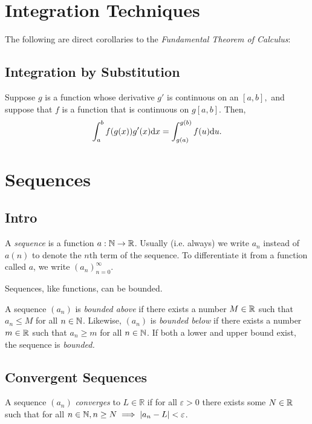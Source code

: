 \documentclass{article}
\begin{document}
  \pagebreak


  \section{Integration Techniques}
  The following are direct corollaries to the \emph{Fundamental Theorem of Calculus}:

  \subsection{Integration by Substitution}
  \begin{thm}[u-substitution]
    Suppose \(g\) is a function whose derivative \(g'\) is continuous on an \([a,b],\) and suppose that \(f\) is a function that is continuous on \(g[a,b].\) Then, \[
      \int_{a}^{b}f(g(x))g'(x) \mathrm{d} x = \int_{g(a)}^{g(b)}f(u) \mathrm{d} u.
    \]
  \end{thm}

  \section{Sequences}
  \subsection{Intro}

  \begin{defi}[Sequence]
    A \emph{sequence} is a function \(a: \mathbb{N} \to \mathbb{R}\). Usually (i.e. always) we write \(a_n\) instead of \(a(n)\) to denote the \(n\)th term of the sequence. To differentiate it from a function called \(a\), we write \((a_n)_{n=0}^{\infty}\). 
    \end{defi}
    Sequences, like functions, can be bounded. 

    \begin{defi}[Boundedness]
      A sequence \((a_n)\) is \emph{bounded above} if there exists a number \(M \in \mathbb{R}\) such that \(a_n \leq M\) for all \(n \in \mathbb{N}\). Likewise, \((a_n)\) is \emph{bounded below} if there exists a number \(m \in \mathbb{R}\) such that \(a_n \geq m\) for all \(n \in \mathbb{N}\). If both a lower and upper bound exist, the sequence is \emph{bounded.}
    \end{defi}

    \subsection{Convergent Sequences}

    \begin{defi}
      A sequence \((a_n)\) \emph{converges} to \(L \in \mathds{R}\) if for all \(\varepsilon > 0\) there exists some \(N \in \mathbb{R}\) such that for all \(n \in \mathbb{N}, n \geq N \implies \left\lvert a_n - L\right\rvert < \varepsilon\).
    \end{defi}
\end{document}
